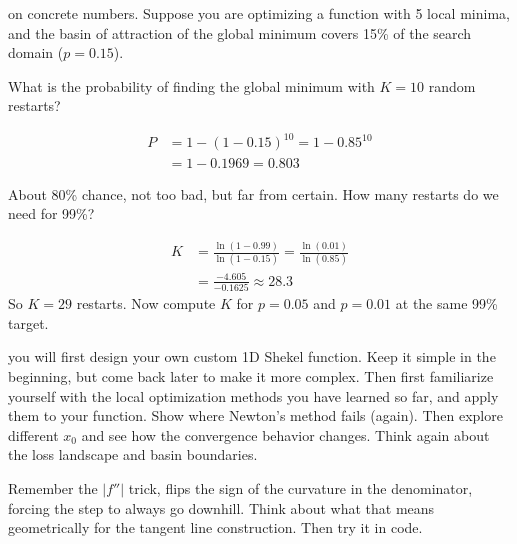 

 on concrete numbers. Suppose you are optimizing a function with 5 local minima, and the basin of attraction of the global minimum covers 15\% of the search domain ($p = 0.15$).


What is the probability of finding the global minimum with $K = 10$ random restarts?

\begin{align*}
    P &= 1 - (1 - 0.15)^{10} = 1 - 0.85^{10} \\
      &= 1 - 0.1969 = 0.803
\end{align*}

About 80\% chance, not too bad, but far from certain. How many restarts do we need for 99\%?

\begin{align*}
    K &= \frac{\ln(1 - 0.99)}{\ln(1 - 0.15)} = \frac{\ln(0.01)}{\ln(0.85)} \\
      &= \frac{-4.605}{-0.1625} \approx 28.3
\end{align*}
So $K = 29$ restarts. Now compute $K$ for $p = 0.05$ and $p = 0.01$ at the same 99\% target. 



 you will first design your own custom 1D Shekel function. Keep it simple in the beginning, but come back later to make it more complex.
Then first familiarize yourself with the local optimization methods you have learned so far, and apply them to your function. 
Show where Newton's method fails (again). Then explore different $x_0$ and see how the convergence behavior changes. Think again about the loss landscape and basin boundaries.

 Remember the $|f''|$ trick, flips the sign of the curvature in the denominator, forcing the step to always go downhill. Think about what that means geometrically for the tangent line construction.
Then try it in code.


